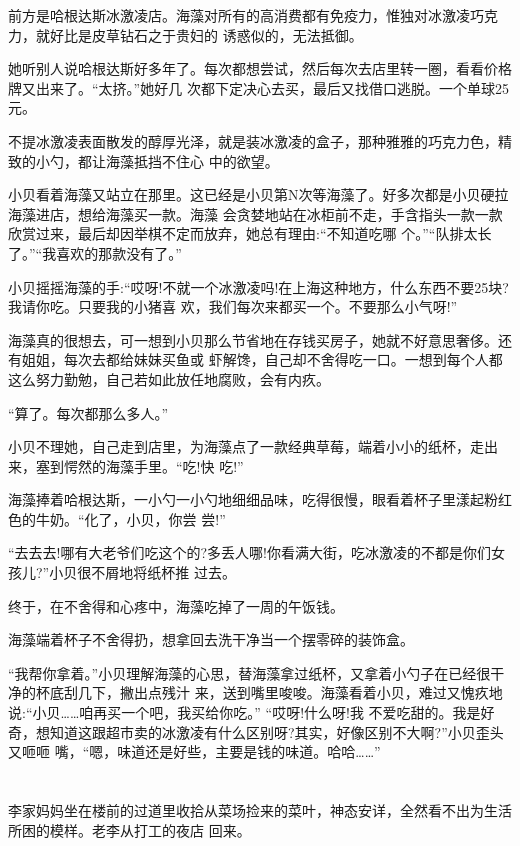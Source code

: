 \documentclass[11pt,a4paper,onecolumn]{article}
\begin{document}
前方是哈根达斯冰激凌店。海藻对所有的高消费都有免疫力，惟独对冰激凌巧克力，就好比是皮草钻石之于贵妇的
诱惑似的，无法抵御。

她听别人说哈根达斯好多年了。每次都想尝试，然后每次去店里转一圈，看看价格牌又出来了。``太挤。''她好几
次都下定决心去买，最后又找借口逃脱。一个单球25元。

不提冰激凌表面散发的醇厚光泽，就是装冰激凌的盒子，那种雅雅的巧克力色，精致的小勺，都让海藻抵挡不住心
中的欲望。

小贝看着海藻又站立在那里。这已经是小贝第N次等海藻了。好多次都是小贝硬拉海藻进店，想给海藻买一款。海藻
会贪婪地站在冰柜前不走，手含指头一款一款欣赏过来，最后却因举棋不定而放弃，她总有理由:``不知道吃哪
个。''``队排太长了。''``我喜欢的那款没有了。''

小贝摇摇海藻的手:``哎呀!不就一个冰激凌吗!在上海这种地方，什么东西不要25块?我请你吃。只要我的小猪喜
欢，我们每次来都买一个。不要那么小气呀!''

海藻真的很想去，可一想到小贝那么节省地在存钱买房子，她就不好意思奢侈。还有姐姐，每次去都给妹妹买鱼或
虾解馋，自己却不舍得吃一口。一想到每个人都这么努力勤勉，自己若如此放任地腐败，会有内疚。

``算了。每次都那么多人。''

小贝不理她，自己走到店里，为海藻点了一款经典草莓，端着小小的纸杯，走出来，塞到愕然的海藻手里。``吃!快
吃!''

海藻捧着哈根达斯，一小勺一小勺地细细品味，吃得很慢，眼看着杯子里漾起粉红色的牛奶。``化了，小贝，你尝
尝!''

``去去去!哪有大老爷们吃这个的?多丢人哪!你看满大街，吃冰激凌的不都是你们女孩儿?''小贝很不屑地将纸杯推
过去。

终于，在不舍得和心疼中，海藻吃掉了一周的午饭钱。

海藻端着杯子不舍得扔，想拿回去洗干净当一个摆零碎的装饰盒。

``我帮你拿着。''小贝理解海藻的心思，替海藻拿过纸杯，又拿着小勺子在已经很干净的杯底刮几下，撇出点残汁
来，送到嘴里唆唆。海藻看着小贝，难过又愧疚地说:``小贝……咱再买一个吧，我买给你吃。'' ``哎呀!什么呀!我
不爱吃甜的。我是好奇，想知道这跟超市卖的冰激凌有什么区别呀?其实，好像区别不大啊?''小贝歪头又咂咂
嘴，``嗯，味道还是好些，主要是钱的味道。哈哈……''

\section[\thesection]{}

李家妈妈坐在楼前的过道里收拾从菜场捡来的菜叶，神态安详，全然看不出为生活所困的模样。老李从打工的夜店
回来。
\end{document}
